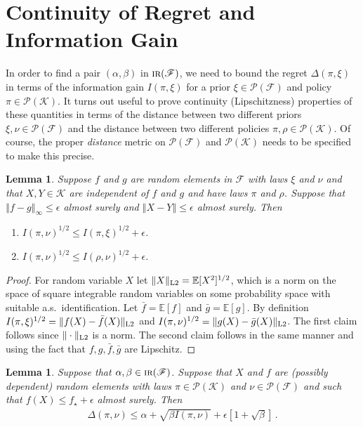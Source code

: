 \documentclass[letter, 12pt]{report}
\newcommand{\norm}[1]{\left \Vert  #1 \right \Vert}
\newcommand{\Lsnorm}[1]{ \Vert  #1 \Vert_{\text{\scriptsize \textrm{L2}}}}
\newcommand{\E}{\mathbb E}
\newcommand{\cK}{\mathcal K}
\newcommand{\sF}{\mathscr F}
\newcommand{\sP}{\mathscr P}
\newcommand{\1}{\mathbf{1}}
\newcommand{\IR}{\operatorname{\textsc{ir}}}
\theoremstyle{plain}
\newtheorem{lemma}[theorem]{Lemma}
\theoremstyle{definition}
\theoremstyle{remark}
\begin{document}
\section{Continuity of Regret and Information Gain}
In order to find a pair $(\alpha, \beta)$ in $\IR(\sF)$, we need to bound the regret $\Delta(\pi, \xi)$
in terms of the information gain $I(\pi, \xi)$ for a prior $\xi \in \sP(\sF)$ and policy $\pi \in \sP(\cK)$.
It turns out useful to prove continuity (Lipschitzness) properties of these quantities
in terms of the distance between two different priors $\xi, \nu \in \sP(\sF)$ and the distance between two different policies $\pi, \rho \in \sP(\cK)$.
Of course, the proper \textit{distance} metric on $\sP(\sF)$ and $\sP(\cK)$ needs to be specified to make this precise.
\begin{lemma}\label{lem:cont:I}
    Suppose $f$ and $g$ are random elements in $\sF$ with laws $\xi$ and $\nu$
    and that $X, Y \in \cK$ are independent of $f$ and $g$ and have laws $\pi$ and $\rho$.
    Suppose that
    $\norm{f - g}_\infty \leq \epsilon$ almost surely and $\norm{X - Y} \leq \epsilon$ almost surely.
    Then
    \begin{enumerate}
        \item $I(\pi, \nu)^{1/2} \leq I(\pi, \xi)^{1/2} + \epsilon$.
        \item $I(\pi, \nu)^{1/2} \leq I(\rho, \nu)^{1/2} + \epsilon$.
    \end{enumerate}
\end{lemma}

\begin{proof}
    For random variable $X$ let $\Lsnorm{X} = \E[X^2]^{1/2}$, which is a norm
    on the space of square integrable random variables on some probability space with suitable a.s.\ identification.
    Let $\bar f = \E[f]$ and $\bar g = \E[g]$.
    By definition $I(\pi, \xi)^{1/2} = \Lsnorm{f(X) - \bar f(X)}$ and $I(\pi, \nu)^{1/2} = \Lsnorm{g(X) - \bar g(X)}$.
    The first claim follows since $\Lsnorm{\cdot}$ is a norm.
    The second claim follows in the same manner and using the fact that $f, g, \bar f, \bar g$ are Lipschitz.
\end{proof}


\begin{lemma}\label{lem:ts-eps}
    Suppose that $\alpha, \beta \in \IR(\sF)$.
    Suppose that $X$ and $f$ are (possibly dependent) random elements with laws $\pi \in \sP(\cK)$ and $\nu \in \sP(\sF)$ and such that
    $f(X) \leq f_\star + \epsilon$ almost surely. Then
    \begin{align*}
        \Delta(\pi, \nu) \leq \alpha + \sqrt{\beta I(\pi, \nu)} + \epsilon\left[1 + \sqrt{\beta}\right]\,.
    \end{align*}
\end{lemma}
\end{document}

